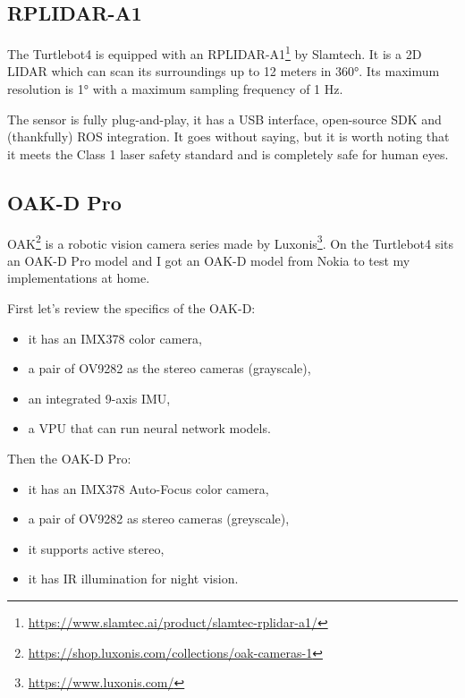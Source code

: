 \subsection{RPLIDAR-A1}

The Turtlebot4 is equipped with an RPLIDAR-A1\footnote{\url{https://www.slamtec.ai/product/slamtec-rplidar-a1/}} by Slamtech. It is a 2D LIDAR which can scan its surroundings up to 12 meters in 360°. Its maximum resolution is 1° with a maximum sampling frequency of 1 Hz.

The sensor is fully plug-and-play, it has a USB interface, open-source SDK and (thankfully) ROS integration. It goes without saying, but it is worth noting that it meets the Class 1 laser safety standard and is completely safe for human eyes\cite{LaserSafety}.

\subsection{OAK-D Pro}

OAK\footnote{\url{https://shop.luxonis.com/collections/oak-cameras-1}} is a robotic vision camera series made by Luxonis\footnote{\url{https://www.luxonis.com/}}. On the Turtlebot4 sits an OAK-D Pro model and I got an OAK-D model from Nokia to test my implementations at home.

First let's review the specifics of the OAK-D:
\begin{itemize}
    \item it has an IMX378 color camera,
    \item a pair of OV9282 as the stereo cameras (grayscale),
    \item an integrated 9-axis IMU,
    \item a VPU that can run neural network models.
\end{itemize}

Then the OAK-D Pro:
\begin{itemize}
    \item it has an IMX378 Auto-Focus color camera,
    \item a pair of OV9282 as stereo cameras (greyscale),
    \item it supports active stereo,
    \item it has IR illumination for night vision.
\end{itemize}


